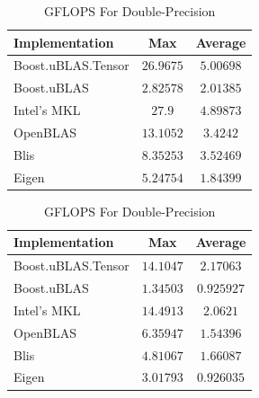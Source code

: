 \begin{table}[ht]
    \centering
    \caption{GFLOPS For Single-Precision}
    \begin{tabular}{|l|c|c|}
        \hline
        \textbf{Implementation} & \textbf{Max} & \textbf{Average}\\
        \hline
        Boost.uBLAS.Tensor  & $26.9675$ & $5.00698$ \\
        \hline
        Boost.uBLAS         & $2.82578$ & $2.01385$ \\
        \hline
        Intel's MKL         & $27.9$ & $4.89873$ \\
        \hline
        OpenBLAS            & $13.1052$ & $3.4242$ \\
        \hline
        Blis                & $8.35253$ & $3.52469$ \\
        \hline
        Eigen               & $5.24754$ & $1.84399$ \\
        \hline
    \end{tabular}

    \vspace*{1 cm}

    \centering
    \caption{GFLOPS For Double-Precision}
    \begin{tabular}{|l|c|c|}
        \hline
        \textbf{Implementation} & \textbf{Max} & \textbf{Average}\\
        \hline
        Boost.uBLAS.Tensor  & $14.1047$ & $2.17063$ \\
        \hline
        Boost.uBLAS         & $1.34503$ & $0.925927$ \\
        \hline
        Intel's MKL         & $14.4913$ & $2.0621$ \\
        \hline
        OpenBLAS            & $6.35947$ & $1.54396$ \\
        \hline
        Blis                & $4.81067$ & $1.66087$ \\
        \hline
        Eigen               & $3.01793$ & $0.926035$ \\
        \hline
    \end{tabular}
\end{table}

